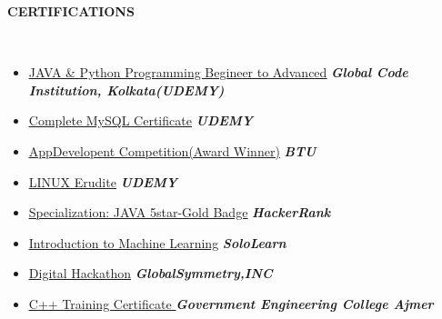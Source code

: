 \documentclass[a4paper,10pt]{article}
\newcommand{\resheading}[1]{{\small \colorbox{mygrey}{\begin{minipage}{0.99\textwidth}{\textbf{#1 \vphantom{p\^{E}}}}\end{minipage}}}}
\begin{document}
\noindent
\resheading{\textbf{CERTIFICATIONS}}\\[-0.3cm]
\begin{itemize}
    
     
     \item \href{https://www.udemy.com/certificate/UC-ec7cb72f-3a9c-4560-9305-7d78189e5014/}{\underline{JAVA \& Python Programming Begineer to Advanced}} \hfill \textbf{\emph{Global Code Institution, Kolkata(UDEMY)}}\\[-0.6cm]
     \item \href{https://www.udemy.com/certificate/UC-8c37fe99-33c9-49a8-91e6-3a22d56acb2d/}{\underline{Complete MySQL Certificate}} \hfill \textbf{\emph{UDEMY}}\\[-0.6cm]
     \item \href{}{\underline{AppDevelopent Competition(Award Winner)}} \hfill \textbf{\emph{BTU}}\\[-0.6cm]
     \item \href{https://www.udemy.com/certificate/UC-a9b62bc4-69c9-40d8-a297-0b45af2ca330/}{\underline{LINUX Erudite}} \hfill \textbf{\emph{UDEMY}}\\[-0.6cm]
     \item \href{https://www.hackerrank.com/anujtiwari1098}{\underline{Specialization: JAVA 5star-Gold Badge}} \hfill \textbf{\emph{HackerRank}}\\[-0.6cm]
     
     \item \href{https://drive.google.com/file/d/1obpzaRhSUReWC6b-wGx2Tb5RQQ425IYo/view?usp=sharing}{\underline{Introduction to Machine Learning}} \hfill \textbf{\emph{SoloLearn}}\\[-0.6cm]
      \item \href{https://drive.google.com/file/d/1m_qS7UoPG_MV3cVlsRds2qSXnGXbaPqa/view?usp=sharing}{\underline{Digital Hackathon}} \hfill \textbf{\emph{GlobalSymmetry,INC}}\\[-0.6cm]
     
      \item \href{https://drive.google.com/file/d/1DFnuYR8PiDrCpTRqSHitH2gxTAyKr9lf/view?usp=sharing}{\underline{C++ Training Certificate }} \hfill \textbf{\emph{Government Engineering College Ajmer}}\\[-0.6cm]
    
\end{itemize}
\end{document}
